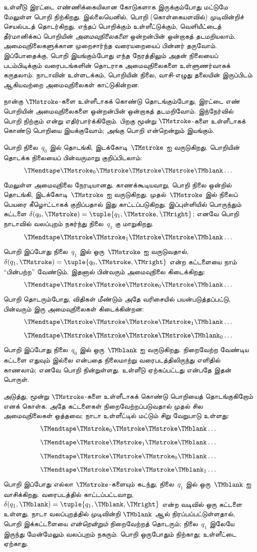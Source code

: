 \documentclass[../../../include/open-logic-section]{subfiles}
\begin{document}
\begin{explain}
உள்ளீடு இரட்டை எண்ணிக்கையிலான கோடுகளாக இருக்கும்போது மட்டுமே
மேலுள்ள பொறி நிற்கிறது. இல்லையெனில், பொறி (கொள்கையளவில்)
முடிவின்றிச் செயல்படத் தொடர்கிறது. எந்தப் பொறிக்கும் உள்ளீட்டுக்கும்,
வெளியீட்டைத் தீர்மானிக்கப் பொறியின் \emph{அமைவுநிலைகளை}
ஒன்றன்பின் ஒன்றாகத் தடமறியலாம். அமைவுநிலைகளுக்கான முறைசார்ந்த
வரையறையைப் பின்னர் தருவோம். இப்போதைக்கு, பொறி இயங்கும்போது எந்த
நேரத்திலும் அதன் நிலையைப் படம்பிடிக்கும் வரைபடங்களின் தொடராக
அமைவுநிலைகளை உள்ளுணர்வாகக் கருதலாம். நாடாவின் உள்ளடக்கம்,
பொறியின் நிலை, வாசி-எழுது தலையின் இருப்பிடம் ஆகியவற்றை
அமைவுநிலைகள் காட்டுகின்றன.

நான்கு $\TMstroke$-களை உள்ளீடாகக் கொண்டு தொடங்கும்போது, இரட்டை
எண் பொறியின் அமைவுநிலைகளை ஒன்றன்பின் ஒன்றாகத் தடமறிவோம்.
இந்நேர்வில் பொறி நிற்கும் என்று எதிர்பார்க்கிறோம். பிறகு மூன்று
$\TMstroke$-களை உள்ளீடாகக் கொண்டு பொறியை இயக்குவோம்; அங்கு பொறி
என்றென்றும் இயங்கும்.

பொறி நிலை~$q_0$ இல் தொடங்கி, இடக்கோடி~$\TMstroke$ ஐ வருடுகிறது.
பொறியின் தொடக்க நிலையைப் பின்வருமாறு குறிப்பிடலாம்:
\[
\TMendtape \TMstroke_0 \TMstroke \TMstroke \TMstroke \TMblank \ldots
\]
மேலுள்ள அமைவுநிலை நேரடியானது. காணக்கூடியவாறு, பொறி நிலை ஒன்றில்
தொடங்கி, இடக்கோடி~$\TMstroke$ ஐ வருடுகிறது. முதல்~$\TMstroke$ இல்
நிலைப் பெயரை கீழொட்டாகக் குறிப்பதால் இது காட்டப்படுகிறது.
இப்புள்ளியில் பொருந்தும் கட்டளை
$\delta(q_0, \TMstroke) = \tuple{q_1, \TMstroke, \TMright}$;
எனவே பொறி நாடாவில் வலப்புறம் நகர்ந்து நிலை~$q_1$ கு மாறுகிறது.
\[
\TMendtape \TMstroke \TMstroke_1 \TMstroke \TMstroke \TMblank \ldots
\]
பொறி இப்போது நிலை~$q_1$ இல் ஒரு~$\TMstroke$ ஐ வருடுவதால்,
$\delta(q_1, \TMstroke) = \tuple{q_0, \TMstroke, \TMright}$
என்ற கட்டளையை நாம் ``பின்பற்ற'' வேண்டும். இதனால்
பின்வரும் அமைவுநிலை கிடைக்கிறது:
\[
\TMendtape \TMstroke \TMstroke \TMstroke_0 \TMstroke \TMblank \ldots
\]
பொறி தொடரும்போது, விதிகள் மீண்டும் அதே வரிசையில் பயன்படுத்தப்பட்டு,
பின்வரும் இரு அமைவுநிலைகள் கிடைக்கின்றன:
\[
\TMendtape \TMstroke \TMstroke \TMstroke \TMstroke_1 \TMblank \ldots
\]
\[
\TMendtape \TMstroke \TMstroke \TMstroke \TMstroke \TMblank_0 \ldots
\]
பொறி இப்போது நிலை~$q_0$ இல் ஒரு~$\TMblank$ ஐ வருடுகிறது.
நிறைவேற்ற வேண்டிய கட்டளை எதுவும் இல்லை என்பதை நிலைமாற்று
வரைபடத்திலிருந்து எளிதில் காணலாம்; எனவே பொறி நின்றுள்ளது.
உள்ளீடு ஏற்கப்பட்டது என்பதே இதன் பொருள்.

அடுத்து, மூன்று $\TMstroke$-களை உள்ளீடாகக் கொண்டு பொறியைத்
தொடங்குகிறோம் எனக் கொள்க. அதே கட்டளைகள் நிறைவேற்றப்படுவதால்
முதல் சில அமைவுநிலைகள் ஒத்தவை; நாடா உள்ளீட்டில் மட்டும் சிறு
வேறுபாடு உள்ளது:
\[
\TMendtape \TMstroke_0 \TMstroke \TMstroke \TMblank \ldots
\]
\[
\TMendtape \TMstroke \TMstroke_1 \TMstroke \TMblank \ldots
\]
\[
\TMendtape \TMstroke \TMstroke \TMstroke_0 \TMblank \ldots
\]
\[
\TMendtape \TMstroke \TMstroke \TMstroke \TMblank_1 \ldots
\]
பொறி இப்போது எல்லா $\TMstroke$-களையும் கடந்து, நிலை~$q_1$ இல்
ஒரு~$\TMblank$ ஐ வாசிக்கிறது. வரைபடத்தில் காட்டப்பட்டவாறு,
$\delta(q_1, \TMblank) =\tuple{q_1, \TMblank, \TMright}$ என்ற
வடிவில் ஒரு கட்டளை உள்ளது. நாடா வலப்புறத்தில் முடிவின்றி
$\TMblank$ ஆல் நிரப்பப்பட்டுள்ளதால், பொறி இக்கட்டளையை
\emph{என்றென்றும்} நிறைவேற்றத் தொடரும்; நிலை~$q_1$ இலேயே இருந்து
மேன்மேலும் வலப்புறம் நகரும். பொறி ஒருபோதும் நிற்காது; உள்ளீட்டை
ஏற்காது.
\end{explain}
\end{document}
